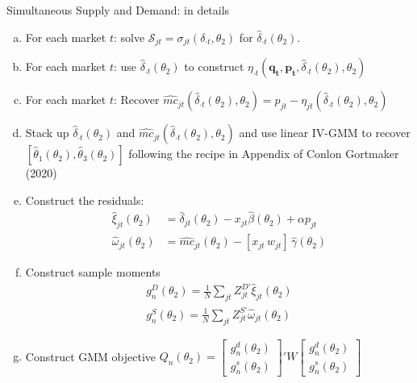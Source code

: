 \begin{frame}{Simultaneous Supply and Demand: in details}
\footnotesize
\begin{enumerate}[(a)]
\item For each market $t$: solve $\mathcal{S}_{jt} = \sigma_{jt}(\delta_{\cdot t},\theta_2)$ for $\widehat{\delta}_{\cdot t}(\theta_2)$.
\item For each market $t$: use $\widehat{\delta}_{\cdot t}(\theta_2)$ to construct $\eta_{\cdot 
t}(\mathbf{q_t},\mathbf{p_t},\widehat{\delta}_{\cdot t}(\theta_2),\theta_2)$
\item For each market $t$: Recover $\widehat{mc}_{jt}(\widehat{\delta}_{\cdot t}(\theta_2),\theta_2) = p_{jt} - \eta_{jt}(\widehat{\delta}_{\cdot t}(\theta_2),\theta_2)$
\item Stack up $\widehat{\delta}_{\cdot t}(\theta_2)$ and $\widehat{mc}_{jt}(\widehat{\delta}_{\cdot t}(\theta_2),\theta_2)$ and use linear IV-GMM to recover $[\widehat{\theta}_1(\theta_2), \widehat{\theta}_3(\theta_2) ]$ following the recipe in Appendix of Conlon Gortmaker (2020)
\item Construct the residuals:
\begin{align*}
\nonumber    \widehat{\xi}_{jt}(\theta_2) &= \widehat{\delta}_{jt}(\theta_2) -  x_{jt} \widehat{\beta}(\theta_2) + \alpha p_{jt}\\
    \widehat{\omega}_{jt}(\theta_2) &= \widehat{mc}_{jt}(\theta_2) -  [x_{jt}\, w_{jt}]\, \widehat{\gamma}(\theta_2)
\end{align*}
\item Construct sample moments
\begin{align*}
\nonumber g_n^D(\theta_2)=\frac{1}{N} \sum_{jt} Z_{jt}^{D\prime} \widehat{\xi}_{jt}(\theta_2)\\
 g_n^S(\theta_2)=\frac{1}{N} \sum_{jt} Z_{jt}^{S \prime} \widehat{\omega}_{jt}(\theta_2)
\end{align*}
\item Construct GMM objective $Q_n(\theta_2)= \left[ {\begin{array}{c} g_n^d(\theta_2) \\ g_n^s(\theta_2) \end{array} } \right]' W  \left[ {\begin{array}{c} g_n^d(\theta_2) \\ g_n^s(\theta_2) \end{array} } \right] $
\end{enumerate}
\end{frame}


